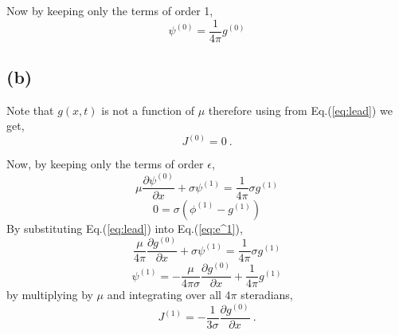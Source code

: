 \documentclass{article}
\begin{document}
\vspace{0.5cm}

Now by keeping only the terms of order 1,
\begin{equation}
\label{eq:lead}
\boxed{ \psi^{(0)} =  \frac{1}{4\pi} g^{(0)} } 
\end{equation}

\subsection*{(b)}

Note that $g(x,t)$ is not a function of $\mu$ therefore using from Eq.(\ref{eq:lead}) we get,
\begin{equation}
J^{(0)} = 0 \: .
\end{equation}

\vspace{0.5cm}

Now, by keeping only the terms of order $\epsilon$,
\begin{equation}
\label{eq:e^1}
\mu \frac{\partial \psi^{(0)} }{\partial x} + \sigma \psi^{(1)}  =  \frac{1}{4\pi} \sigma g^{(1)} 
\end{equation}
\begin{equation*}
0 = \sigma ( \phi^{(1)} - g^{(1)} )  
\end{equation*}
By substituting Eq.(\ref{eq:lead}) into Eq.(\ref{eq:e^1}),
\begin{equation*}
\frac{\mu}{4\pi} \frac{\partial g^{(0)} }{\partial x} + \sigma \psi^{(1)}  =  \frac{1}{4\pi} \sigma g^{(1)} 
\end{equation*}
\begin{equation*}
\psi^{(1)}  = - \frac{\mu}{4\pi\sigma} \frac{\partial g^{(0)} }{\partial x} + \frac{1}{4\pi} g^{(1)} 
\end{equation*}
by multiplying by $\mu$ and integrating over all $4\pi$ steradians, 
\begin{equation}
\label{eq:J}
J^{(1)} = -\frac{1 }{3\sigma} \frac{\partial g^{(0)} }{\partial x}  \: .
\end{equation}
\end{document}
